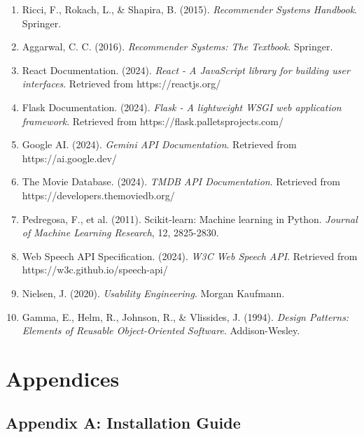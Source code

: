 \documentclass[12pt,a4paper]{article}
\begin{document}
\begin{enumerate}
    \item Ricci, F., Rokach, L., \& Shapira, B. (2015). \textit{Recommender Systems Handbook}. Springer.
    
    \item Aggarwal, C. C. (2016). \textit{Recommender Systems: The Textbook}. Springer.
    
    \item React Documentation. (2024). \textit{React - A JavaScript library for building user interfaces}. Retrieved from https://reactjs.org/
    
    \item Flask Documentation. (2024). \textit{Flask - A lightweight WSGI web application framework}. Retrieved from https://flask.palletsprojects.com/
    
    \item Google AI. (2024). \textit{Gemini API Documentation}. Retrieved from https://ai.google.dev/
    
    \item The Movie Database. (2024). \textit{TMDB API Documentation}. Retrieved from https://developers.themoviedb.org/
    
    \item Pedregosa, F., et al. (2011). Scikit-learn: Machine learning in Python. \textit{Journal of Machine Learning Research}, 12, 2825-2830.
    
    \item Web Speech API Specification. (2024). \textit{W3C Web Speech API}. Retrieved from https://w3c.github.io/speech-api/
    
    \item Nielsen, J. (2020). \textit{Usability Engineering}. Morgan Kaufmann.
    
    \item Gamma, E., Helm, R., Johnson, R., \& Vlissides, J. (1994). \textit{Design Patterns: Elements of Reusable Object-Oriented Software}. Addison-Wesley.
\end{enumerate}

\section{Appendices}

\subsection{Appendix A: Installation Guide}
\end{document}
